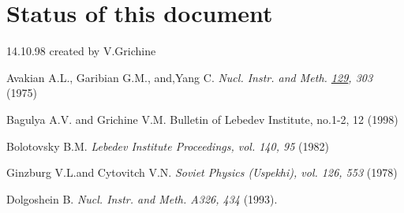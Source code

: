 \section{Status of this document}
14.10.98 created by V.Grichine

\begin{thebibliography}{99}

 Avakian A.L., Garibian G.M., and,Yang C.
{\em Nucl. Instr. and Meth.  \underline{129}, 303} (1975)

 Bagulya A.V. and Grichine V.M.
{Bulletin of Lebedev Institute, no.1-2, 12 } (1998)

  Bolotovsky B.M.
{\em Lebedev Institute Proceedings, vol. 140, 95} (1982)

 Ginzburg V.L.and Cytovitch V.N.
{\em Soviet Physics (Uspekhi), vol. 126, 553 } (1978)

 Dolgoshein B.  
{\em Nucl. Instr. and Meth.  A326, 434} (1993).

\end{thebibliography}
